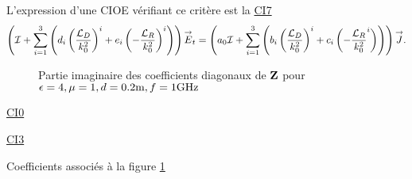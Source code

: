       L'expression d'une CIOE vérifiant ce critère est la \hyperlink{ci7}{CI7}
      \begin{equation}
        \left({\mathcal{I}} + \sum_{i=1}^3 \left(d_{i} \left(\dfrac{{\mathcal{L}_D}}{k_0^2}\right)^i + e_{i} \left(-\dfrac{{\mathcal{L}_R}}{k_0^2}\right)^i \right)\right){\overset{\rightarrow}{E}}_t = \left(a_0 {\mathcal{I}} + \sum_{i=1}^3 \left(b_{i} \left(\dfrac{{\mathcal{L}_D}}{k_0^2}\right)^i + c_{i} \left(-\dfrac{{\mathcal{L}_R}}{k_0^2}^i\right) \right)\right){\overset{\rightarrow}{J}}.
      \end{equation}

      \begin{figure}[!hbt]
          \centering
          
          \caption[CIOE sur empilement avec triple asymptote]{Partie imaginaire des coefficients diagonaux de \(\mathbf{Z}\) pour \(\epsilon = 4, \mu = 1, d=0.2\text{m}, f=1\text{GHz}\)}
          \label{fig:imp_fourier:plan:triple_asymptote:hoibc}
      \end{figure}
      \begin{table}[!hbt]
        \centering
        \begin{minipage}[t]{0.49\textwidth}
        \vspace{0pt}
        \centering
        \begin{coefftable}{\hyperlink{ci0}{CI0}}
          
        \end{coefftable}

        \begin{coefftable}{\hyperlink{ci3}{CI3}}
          
        \end{coefftable}
        \end{minipage}
        \caption{Coefficients associés à la figure \ref{fig:imp_fourier:plan:triple_asymptote:hoibc}}
        \label{tab:imp_fourier:plan:triple_asymptote:hoibc}
      \end{table}
